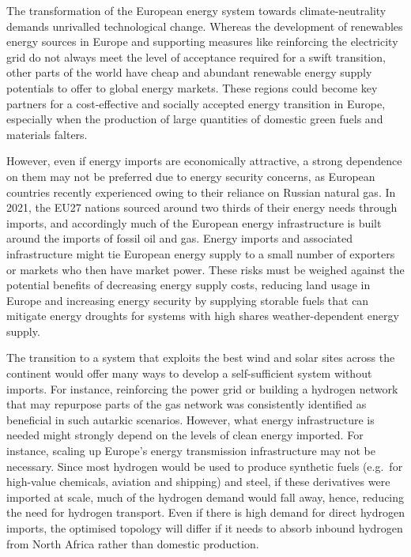 
The transformation of the European energy system towards climate-neutrality
demands unrivalled technological change. Whereas the development of renewables
energy sources in Europe and supporting measures like reinforcing the
electricity grid do not always meet the level of acceptance required for a swift
transition, other parts of the world have cheap and abundant renewable energy
supply potentials to offer to global energy
markets.\cite{irenaGlobalHydrogen2022,luxSupplyCurves2021,vanderzwaanTimmermansDream2021,fasihiLongTermHydrocarbon2017,reichenbergDeepDecarbonization2022,galvanExportingSunshine2022,armijoFlexibleProduction2020,pfennigGlobalGISbased2022}
These regions could become key partners for a cost-effective and socially
accepted energy transition in Europe, especially when the production of
large quantities of domestic green fuels and materials falters.


However, even if energy imports are economically attractive, a strong dependence
on them may not be preferred due to energy security concerns, as European
countries recently experienced owing to their reliance on Russian natural
gas.\cite{pedersenLongtermImplications2022} In 2021, the EU27 nations sourced
around two thirds of their energy needs through
imports,\cite{eurostatCompleteEnergy2023} and accordingly much of the European
energy infrastructure is built around the imports of fossil oil and gas. Energy
imports and associated infrastructure might tie European energy supply to a
small number of exporters or markets who then have market power. These risks
must be weighed against the potential benefits of decreasing energy supply
costs, reducing land usage in Europe and increasing energy security by supplying
storable fuels that can mitigate energy droughts for systems with high shares
weather-dependent energy supply.


The transition to a system that exploits the best wind and solar sites across
the continent would offer many ways to develop a self-sufficient system without
imports.\cite{pickeringDiversityOptions2022,trondleHomemadeImported2019,brownSynergiesSector2018}
For instance, reinforcing the power grid or building a hydrogen network that may
repurpose parts of the gas network was consistently identified as beneficial in
such autarkic
scenarios.\cite{neumannPotentialRole2023,victoriaSpeedTechnological2022}
However, what energy infrastructure is needed might strongly depend on the
levels of clean energy imported. For instance, scaling up Europe's energy
transmission infrastructure may not be necessary. Since most hydrogen would be
used to produce synthetic fuels (e.g.~for high-value chemicals, aviation and
shipping) and steel,\cite{neumannPotentialRole2023} if these derivatives were
imported at scale, much of the hydrogen demand would fall away, hence, reducing
the need for hydrogen transport. Even if there is high demand for direct
hydrogen imports, the optimised topology will differ if it needs to absorb
inbound hydrogen from North Africa rather than domestic production.

